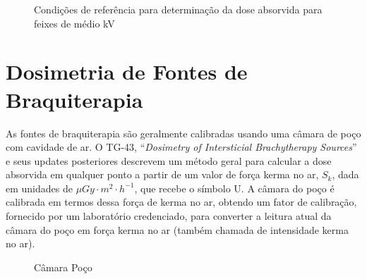 \documentclass[11pt,a4paper]{article}
\begin{document}
	\begin{figure}[h]
		\centering
		\caption{Condições de referência para determinação da dose absorvida para feixes de médio kV}
		\label{fig:condicoesReferenciaDoseMediokv}
	\end{figure}

\section{Dosimetria de Fontes de Braquiterapia}

	As fontes de braquiterapia são geralmente calibradas usando uma câmara de poço com cavidade de ar. O TG-43, ``\textit{Dosimetry of Intersticial Brachytherapy Sources}'' e seus updates posteriores descrevem um método geral para calcular a dose absorvida em qualquer ponto a partir de um valor de força kerma no ar, $S_k$, dada em  unidades de $\mu Gy \cdot m^2 \cdot h^{-1}$, que recebe o símbolo U. A câmara do poço é calibrada em termos dessa força de kerma no ar, obtendo um fator de calibração, fornecido por um laboratório credenciado, para converter a leitura atual da câmara do poço em força kerma no ar (também chamada de intensidade kerma no ar).

	\begin{figure}
		\centering
		\caption{Câmara Poço}
		\label{fig:camaraPoco}
	\end{figure}
\end{document}
